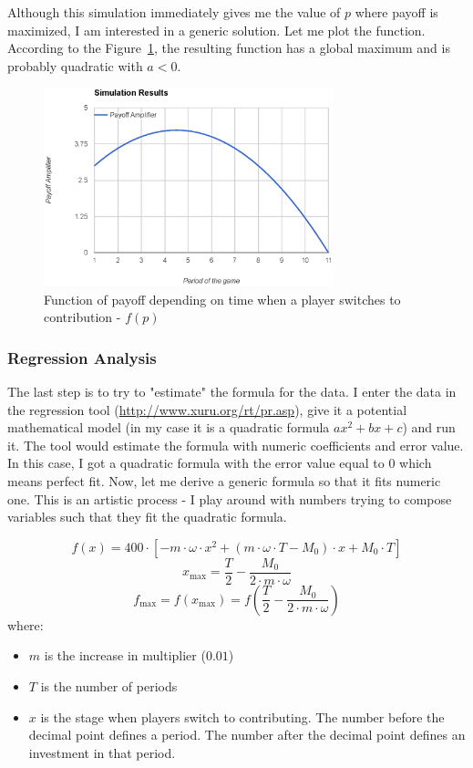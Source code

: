 			Although this simulation immediately gives me the value of $p$ where payoff is maximized, I am interested in a generic solution. Let me plot the function. According to the Figure~\ref{fig:function}, the resulting function has a global maximum and is probably quadratic with $a < 0$.

			\begin{figure}
				\begin{center}
					\includegraphics[width=8.4cm]{resources/eps/function.eps}
					\caption{Function of payoff depending on time when a player switches to contribution - $f(p)$} 
					\label{fig:function}
				\end{center}
			\end{figure}
		
		\subsubsection{Regression Analysis}
		
			The last step is to try to "estimate" the formula for the data. I enter the data in the regression tool (\url{http://www.xuru.org/rt/pr.asp}), give it a potential mathematical model (in my case it is a quadratic formula $ax^2 + bx + c$) and run it. The tool would estimate the formula with numeric coefficients and error value. In this case, I got a quadratic formula with the error value equal to $0$ which means perfect fit. Now, let me derive a generic formula so that it fits numeric one. This is an artistic process - I play around with numbers trying to compose variables such that they fit the quadratic formula.
			
			\[
				f(x) = 400 \cdot \left[ - m \cdot \omega \cdot x^2 + (m \cdot \omega \cdot T - M_0) \cdot x + M_0 \cdot T \right]
			\]
			\[
				x_\text{max} = \frac{T}{2} - \frac{M_0}{2 \cdot m \cdot \omega}
			\]
			\[
				f_\text{max} = f(x_\text{max}) = f \left(\frac{T}{2} - \frac{M_0}{2 \cdot m \cdot \omega} \right)
			\]
			where:
			\begin{itemize}
				\item
					$m$ is the increase in multiplier ($0.01$)
				\item
					$T$ is the number of periods
				\item
					$x$ is the stage when players switch to contributing. The number before the decimal point defines a period. The number after the decimal point defines an investment in that period.
			\end{itemize}
			
